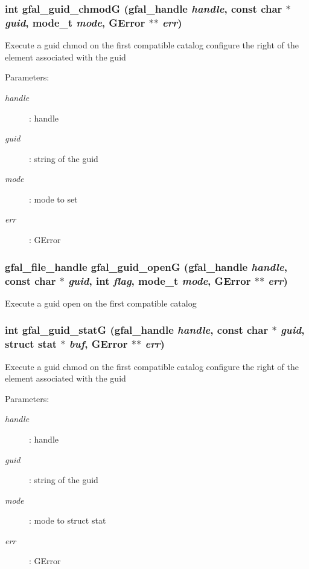 \subsubsection{\setlength{\rightskip}{0pt plus 5cm}int gfal\_\-guid\_\-chmod\-G (gfal\_\-handle {\em handle}, const char $\ast$ {\em guid}, mode\_\-t {\em mode}, GError $\ast$$\ast$ {\em err})}\label{gfal__common__guid_8h_34d01b3a64910eddc1d7988c6b1b2ae4}


Execute a guid chmod on the first compatible catalog configure the right of the element associated with the guid \begin{Desc}
\item[Parameters:]
\begin{description}
\item[{\em handle}]: handle \item[{\em guid}]: string of the guid \item[{\em mode}]: mode to set \item[{\em err}]: GError \end{description}
\end{Desc}
\subsubsection{\setlength{\rightskip}{0pt plus 5cm}gfal\_\-file\_\-handle gfal\_\-guid\_\-open\-G (gfal\_\-handle {\em handle}, const char $\ast$ {\em guid}, int {\em flag}, mode\_\-t {\em mode}, GError $\ast$$\ast$ {\em err})}\label{gfal__common__guid_8h_4840abc33d84aa6fdd9df4a43dff946c}


Execute a guid open on the first compatible catalog 
\subsubsection{\setlength{\rightskip}{0pt plus 5cm}int gfal\_\-guid\_\-stat\-G (gfal\_\-handle {\em handle}, const char $\ast$ {\em guid}, struct stat $\ast$ {\em buf}, GError $\ast$$\ast$ {\em err})}\label{gfal__common__guid_8h_8aebd0a4a29dd4154971395741587405}


Execute a guid chmod on the first compatible catalog configure the right of the element associated with the guid \begin{Desc}
\item[Parameters:]
\begin{description}
\item[{\em handle}]: handle \item[{\em guid}]: string of the guid \item[{\em mode}]: mode to struct stat \item[{\em err}]: GError \end{description}
\end{Desc}
